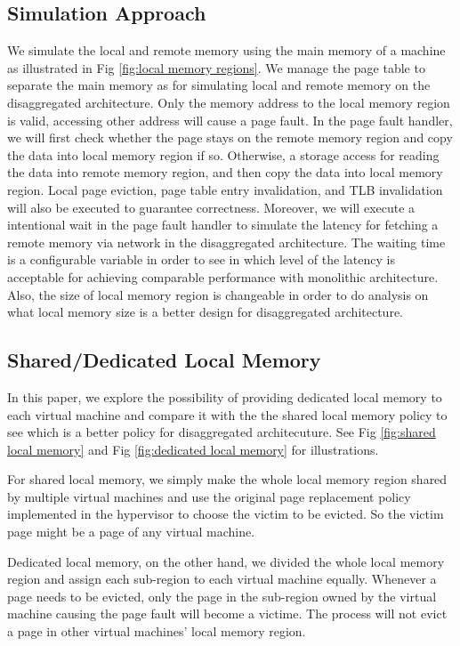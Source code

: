 \documentclass[twocolumn]{article}
\begin{document}
\subsection{Simulation Approach}
We simulate the local and remote memory using the main memory of a machine as illustrated in Fig \ref{fig:local memory regions}. We manage the page table to separate the main memory as for simulating local and remote memory on the disaggregated architecture. Only the memory address to the local memory region is valid, accessing other address will cause a page fault. In the page fault handler, we will first check whether the page stays on the remote memory region and copy the data into local memory region if so. Otherwise, a storage access for reading the data into remote memory region, and then copy the data into local memory region. Local page eviction, page table entry invalidation, and TLB invalidation will also be executed to guarantee correctness. Moreover, we will execute a intentional wait in the page fault handler to simulate the latency for fetching a remote memory via network in the disaggregated architecture. The waiting time is a configurable variable in order to see in which level of the latency is acceptable for achieving comparable performance with monolithic architecture. Also, the size of local memory region is changeable in order to do analysis on what local memory size is a better design for disaggregated architecture.

\subsection{Shared/Dedicated Local Memory}
In this paper, we explore the possibility of providing dedicated local memory to each virtual machine and compare it with the the shared local memory policy to see which is a better policy for disaggregated architecuture. See Fig \ref{fig:shared local memory} and Fig \ref{fig:dedicated local memory} for illustrations.

For shared local memory, we simply make the whole local memory region shared by multiple virtual machines and use the original page replacement policy implemented in the hypervisor to choose the victim to be evicted. So the victim page might be a page of any virtual machine.

Dedicated local memory, on the other hand, we divided the whole local memory region and assign each sub-region to each virtual machine equally. Whenever a page needs to be evicted, only the page in the sub-region owned by the virtual machine causing the page fault will become a victime. The process will not evict a page in other virtual machines' local memory region.
\end{document}
